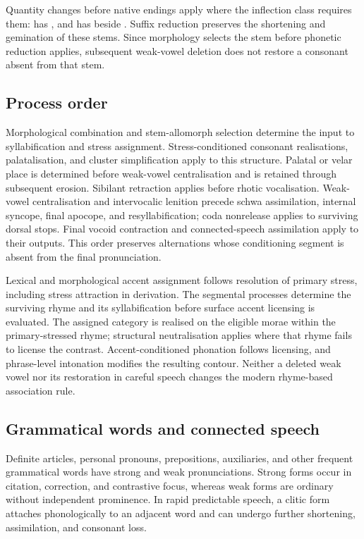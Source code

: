 Quantity changes before native endings apply where the inflection class requires them:  has , and  has  beside . Suffix reduction preserves the shortening and gemination of these stems. Since morphology selects the stem before phonetic reduction applies, subsequent weak-vowel deletion does not restore a consonant absent from that stem.

\subsection{Process order}

Morphological combination and stem-allomorph selection determine the input to syllabification and stress assignment. Stress-conditioned consonant realisations, palatalisation, and cluster simplification apply to this structure. Palatal or velar place is determined before weak-vowel centralisation and is retained through subsequent erosion. Sibilant retraction applies before rhotic vocalisation. Weak-vowel centralisation and intervocalic lenition precede schwa assimilation, internal syncope, final apocope, and resyllabification; coda nonrelease applies to surviving dorsal stops. Final vocoid contraction and connected-speech assimilation apply to their outputs. This order preserves alternations whose conditioning segment is absent from the final pronunciation.

Lexical and morphological accent assignment follows resolution of primary stress, including stress attraction in derivation. The segmental processes determine the surviving rhyme and its syllabification before surface accent licensing is evaluated. The assigned category is realised on the eligible morae within the primary-stressed rhyme; structural neutralisation applies where that rhyme fails to license the contrast. Accent-conditioned phonation follows licensing, and phrase-level intonation modifies the resulting contour. Neither a deleted weak vowel nor its restoration in careful speech changes the modern rhyme-based association rule.

\subsection{Grammatical words and connected speech}
\label{sec:connected-speech}

Definite articles, personal pronouns, prepositions, auxiliaries, and other frequent grammatical words have strong and weak pronunciations. Strong forms occur in citation, correction, and contrastive focus, whereas weak forms are ordinary without independent prominence. In rapid predictable speech, a clitic form attaches phonologically to an adjacent word and can undergo further shortening, assimilation, and consonant loss.

